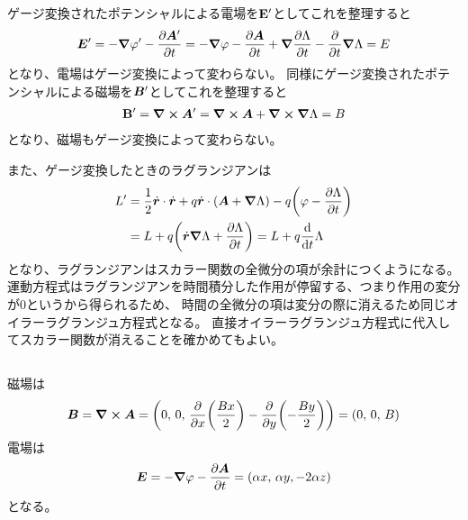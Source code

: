 \documentclass[../../master.tex]{subfiles}
\begin{document}
\subsection{}
ゲージ変換されたポテンシャルによる電場を\(\vb{E}'\)としてこれを整理すると
\begin{equation}\begin{aligned}[b]
    \vb*{E}' = -\grad \varphi' - \pdv{\vb*{A}'}{t}
    = -\grad \varphi - \pdv{\vb*{A}}{t} + \grad{\pdv{\Lambda}{t}}-\pdv{t}\grad{\Lambda}
    = E
\end{aligned}\end{equation}
となり、電場はゲージ変換によって変わらない。
同様にゲージ変換されたポテンシャルによる磁場を\(\vb*{B}'\)としてこれを整理すると
\begin{equation}\begin{aligned}[b]
    \vb{B}' = \curl{\vb*{A}'} = \curl{\vb*{A}} + \curl{\grad{\Lambda}} = B
\end{aligned}\end{equation}
となり、磁場もゲージ変換によって変わらない。

また、ゲージ変換したときのラグランジアンは
\begin{align*}
    L' &= \frac{1}{2}\dot{\vb*{r}}\cdot\dot{\vb*{r}} + q\dot{\vb*{r}}\cdot\qty(\vb*{A}+\grad{\Lambda})- q\qty(\varphi-\pdv{\Lambda}{t})\\
    &= L + q\qty(\dot{\vb*{r}}\grad{\Lambda}+\pdv{\Lambda}{t}) = L + q\dv{t}\Lambda
\end{align*}
となり、ラグランジアンはスカラー関数の全微分の項が余計につくようになる。
運動方程式はラグランジアンを時間積分した作用が停留する、つまり作用の変分が0というから得られるため、
時間の全微分の項は変分の際に消えるため同じオイラーラグランジュ方程式となる。
直接オイラーラグランジュ方程式に代入してスカラー関数が消えることを確かめてもよい。

\subsection{}
磁場は
\begin{equation}\begin{aligned}[b]
    \vb*{B} = \curl{\vb*{A}} = \qty(0,\,0,\,\pdv{x}\qty(\frac{Bx}{2})-\pdv{y}\qty(-\frac{By}{2})) = \qty(0,\,0,\,B)
\end{aligned}\end{equation}
電場は
\begin{equation}\begin{aligned}[b]
    \vb*{E} = -\grad{\varphi} - \pdv{\vb*{A}}{t} = \qty(\alpha x,\,\alpha y, -2\alpha z)
\end{aligned}\end{equation}
となる。
\end{document}
